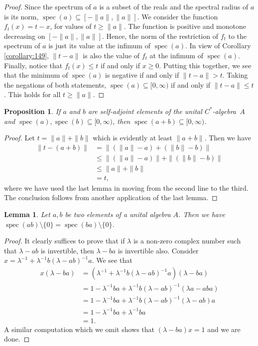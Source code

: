\documentclass{book}
\newtheorem{lemma}[definition]{Lemma}
\newtheorem{proposition}[definition]{Proposition}
\def\cstar{\(C^*\)-algebra}
\begin{document}
\begin{proof}
  Since the spectrum of \(a\) is a subset of the reals and the spectral radius
  of \(a\) is its norm, \(\operatorname{spec}(a) \subseteq [-\|a\| , \|a\| ]\). We consider the function \(f_t(x) = t-x\),
  for values of \(t \geq \|a\|\). The function is positive and monotone decreasing on
  \([-\|a\| , \|a\| ]\). Hence, the norm of the restriction of \(f_t\) to the spectrum of \(a\) is
  just its value at the infimum of \(\operatorname{spec}(a)\). In view of Corollary \ref{corollary:149}, \(\|t-a\|\) is
  also the value of \(f_t\) at the infimum of \(\operatorname{spec}(a)\). Finally, notice that \(f_t(x) \leq t\)
  if and only if \(x \geq 0\). Putting this together, we see that the minimum of
  \(\operatorname{spec}(a)\) is negative if and only if \(\|t - a\| > t\). Taking the negations of both
  statements, \(\operatorname{spec}(a) \subseteq [0,\infty)\) if and only if \(\|t - a\| \leq t\). This holds for all
  \(t \geq \|a\|\).
\end{proof}
\begin{proposition}\label{prop:163}
  If \(a\) and \(b\) are self-adjoint elements of the unital \cstar\ \(A\) and \(\operatorname{spec}(a),\operatorname{spec}(b) \subseteq [0,\infty)\), 
  then \(\operatorname{spec}(a + b) \subseteq [0,\infty)\).
\end{proposition}
\begin{proof}
  Let \(t = \|a\| + \|b\|\) which is evidently at least \(\|a+b\|\). Then we have
  \begin{align*}
    \|t -(a+b)\| &= \|( \|a\| -a)+( \|b\| -b)\|\\
    &\leq \|( \|a\| -a)\| + \|( \|b\| -b)\|\\
    &\leq \|a\| + \|b\|\\
    &= t,
  \end{align*}
  where we have used the last lemma in moving from the second line to the
  third. The conclusion follows from another application of the last lemma.
\end{proof}
\begin{lemma}\label{lemma:164}
  Let \(a,b\) be two elements of a unital algebra \(A\). Then we have
  \(\operatorname{spec}(ab) \setminus \{0\} = \operatorname{spec}(ba) \setminus \{0\}\).
\end{lemma}
\begin{proof}
  It clearly suffices to prove that if \(\lambda\) is a non-zero complex number
  such that \(\lambda - ab\) is invertible, then \(\lambda - ba\) is invertible also. 
  Consider \(x = \lambda^{-1} +\lambda^{-1}b(\lambda-ab)^{-1}a\). We see that
  \begin{align*}
    x(\lambda -ba) &= (\lambda^{-1}+\lambda^{-1}b(\lambda-ab)^{-1}a)(\lambda-ba)\\
    &= 1-\lambda^{-1}ba+\lambda^{-1}b(\lambda-ab)^{-1}(\lambda a-aba)\\
    &= 1-\lambda^{-1}ba+\lambda^{-1}b(\lambda-ab)^{-1}(\lambda-ab)a\\
    &= 1-\lambda^{-1}ba+\lambda^{-1}ba\\
    &= 1.
  \end{align*}
  A similar computation which we omit shows that \((\lambda - ba)x = 1\) and we are
  done.
\end{proof}
\end{document}

